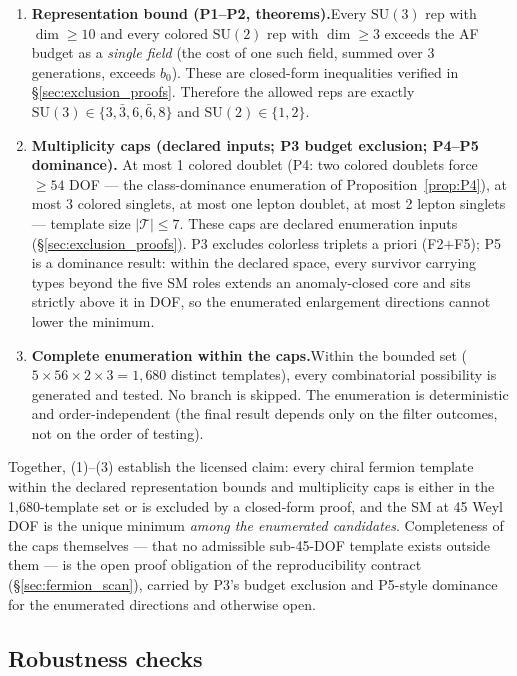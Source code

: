 \documentclass[11pt]{article}
\theoremstyle{definition}
\newcommand{\SU}{\mathrm{SU}}
\begin{document}
\begin{enumerate}[nosep]
\item \textbf{Representation bound (P1--P2, theorems).}\quad Every
$\SU(3)$ rep with $\dim \ge 10$ and every colored $\SU(2)$ rep with
$\dim \ge 3$ exceeds the AF budget as a \emph{single field} (the cost
of one such field, summed over 3 generations, exceeds $b_0$).  These
are closed-form inequalities verified in \S\ref{sec:exclusion_proofs}.
Therefore the allowed reps are exactly
$\SU(3) \in \{3,\bar{3},6,\bar{6},8\}$ and $\SU(2) \in \{1,2\}$.

\item \textbf{Multiplicity caps (declared inputs; P3 budget exclusion; P4--P5 dominance).}\quad
At most 1 colored doublet (P4: two colored doublets force $\ge 54$
DOF --- the class-dominance enumeration of
Proposition~\ref{prop:P4}), at most 3 colored singlets,
at most one lepton doublet, at most 2 lepton singlets --- template size
$|\mathcal{T}| \le 7$.  These caps are declared enumeration inputs
(\S\ref{sec:exclusion_proofs}).  P3 excludes colorless triplets a priori
(F2$+$F5); P5 is a dominance result: within the declared space, every
survivor carrying types beyond the five SM roles extends an
anomaly-closed core and sits strictly above it in DOF, so the
enumerated enlargement directions cannot lower the
minimum.

\item \textbf{Complete enumeration within the caps.}\quad Within the
bounded set ($5 \times 56 \times 2 \times 3 = 1{,}680$ distinct
templates), every combinatorial possibility is generated and tested.
No branch is skipped.  The enumeration is deterministic and
order-independent (the final result depends only on the filter
outcomes, not on the order of testing).
\end{enumerate}

\noindent Together, (1)--(3) establish the licensed claim: every
chiral fermion template within the declared representation bounds and
multiplicity caps is either in the 1{,}680-template set or is excluded
by a closed-form proof, and the SM at 45 Weyl DOF is the unique
minimum \emph{among the enumerated candidates}.  Completeness of the
caps themselves --- that no admissible sub-45-DOF template exists
outside them --- is the open proof obligation of the reproducibility
contract (\S\ref{sec:fermion_scan}), carried by P3's budget exclusion and P5-style dominance
for the enumerated directions and otherwise open.

\subsection{Robustness checks}
\label{app:robustness}
\end{document}
